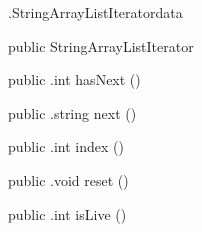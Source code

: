 \begin{CrexxClass}{.StringArrayListIterator}{data}

  \begin{Hierarchy}
  \end{Hierarchy}

  \begin{Members}

    \Factory
      {public}
      {StringArrayListIterator}
      {}

    \Method
      {public}
      {.int}
      {hasNext}
      {()}

    \Method
      {public}
      {.string}
      {next}
      {()}

    \Method
      {public}
      {.int}
      {index}
      {()}

    \Method
      {public}
      {.void}
      {reset}
      {()}

    \Method
      {public}
      {.int}
      {isLive}
      {()}

  \end{Members}
\end{CrexxClass}

